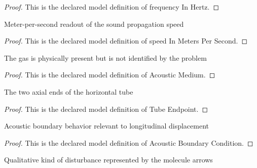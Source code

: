 \begin{proof}
  This is the declared model definition of frequency In Hertz.
\end{proof}
\begin{definition}
  \label{def:physics:phyx-mini-0179:phyxminiproblems-problemphyxmini0179-speedinmeterspersecond}
  Meter-per-second readout of the sound propagation speed
\end{definition}
\begin{proof}
  This is the declared model definition of speed In Meters Per Second.
\end{proof}
\begin{definition}
  \label{def:physics:phyx-mini-0179:phyxminiproblems-problemphyxmini0179-acousticmedium}
  The gas is physically present but is not identified by the problem
\end{definition}
\begin{proof}
  This is the declared model definition of Acoustic Medium.
\end{proof}
\begin{definition}
  \label{def:physics:phyx-mini-0179:phyxminiproblems-problemphyxmini0179-tubeendpoint}
  The two axial ends of the horizontal tube
\end{definition}
\begin{proof}
  This is the declared model definition of Tube Endpoint.
\end{proof}
\begin{definition}
  \label{def:physics:phyx-mini-0179:phyxminiproblems-problemphyxmini0179-acousticboundarycondition}
  Acoustic boundary behavior relevant to longitudinal displacement
\end{definition}
\begin{proof}
  This is the declared model definition of Acoustic Boundary Condition.
\end{proof}
\begin{definition}
  \label{def:physics:phyx-mini-0179:phyxminiproblems-problemphyxmini0179-acousticwavekind}
  Qualitative kind of disturbance represented by the molecule arrows
\end{definition}
